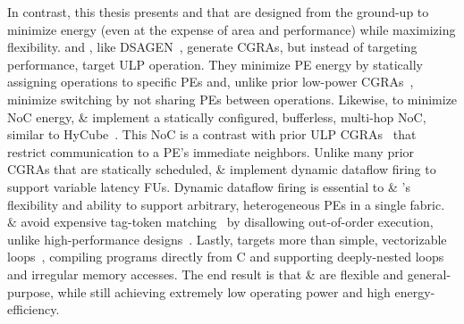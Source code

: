In contrast, this thesis presents \snafu and \riptide that are designed from the ground-up to minimize energy (even at the expense of area and performance) while maximizing flexibility.
% 
\snafu and \riptide, like DSAGEN~\cite{weng2020dsagen}, generate CGRAs, but instead of targeting performance, target ULP operation.
%
They minimize PE energy by statically assigning operations
to specific PEs and, unlike prior low-power
CGRAs~\cite{tan2018stitch,karunaratne2017hycube,ipa,cma,srp},
minimize switching by not sharing PEs between operations.
%
Likewise, to minimize NoC energy, \snafu \& \riptide implement a statically configured, bufferless, multi-hop NoC,
similar to HyCube~\cite{karunaratne2017hycube}.
This NoC is a contrast with prior ULP CGRAs~\cite{cma,srp,ipa}
that restrict communication to a PE's immediate neighbors.
%
Unlike many prior CGRAs that are statically scheduled,
\snafu \& \riptide implement dynamic dataflow firing
to support variable latency FUs.
%
Dynamic dataflow firing is essential to \snafu \& \riptide's flexibility
and ability to support arbitrary, heterogeneous PEs in a single fabric.
%
\snafu \& \riptide avoid expensive tag-token matching~\cite{plasticine,dyser}
by disallowing out-of-order execution, unlike high-performance designs~\cite{ttda,parashar2013triggered,voitsechov2014single,swanson2003wavescalar}.
% 
Lastly, \riptide targets more than simple, vectorizable loops~\cite{karunaratne2017hycube,ipa,cma,srp}, compiling programs directly from C and supporting deeply-nested loops and irregular memory accesses.
%
The end result is that \snafu \& \riptide are flexible and general-purpose,
while still achieving extremely low operating power and high energy-efficiency.

